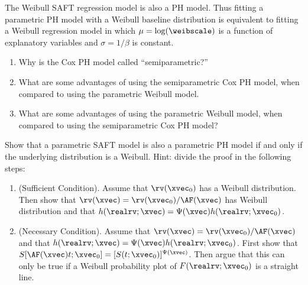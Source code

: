 \begin{exercise}
The Weibull SAFT regression model is also a PH model. Thus fitting a
parametric PH model with a Weibull baseline distribution is equivalent
to fitting a Weibull regression model in which $\mu=\log(\weibscale)$
is a function of explanatory variables and $\sigma=1/\beta$ is
constant.
\begin{enumerate}
\item
Why is the Cox PH model called ``semiparametric?''
\item
What are some advantages of using the semiparametric Cox PH model,
when compared to using the parametric Weibull model.
\item
What are some advantages of using the parametric Weibull model, when
compared to using the semiparametric Cox PH model?  
\end{enumerate}
\end{exercise}

\begin{exercise1}
Show that a parametric SAFT model is also a parametric PH model if and
only if the underlying distribution is a Weibull.
Hint: divide the proof in the following steps:
\begin{enumerate}
\item
(Sufficient Condition). Assume that $\rv(\xvec_{0})$ has a Weibull
distribution. Then show that
$\rv(\xvec)=\rv(\xvec_{0})/\AF(\xvec)$ has
Weibull distribution and that
$h(\realrv; \xvec)=\Psi(\xvec) h(\realrv; \xvec_{0})$.
\item
(Necessary Condition). Assume that
$\rv(\xvec)=\rv(\xvec_{0})/\AF(\xvec)$ and
that
$h(\realrv; \xvec)=\Psi(\xvec) h(\realrv; \xvec_{0})$.
First show that
$S[\AF(\xvec) t;\xvec_{0}] = [S(t;\xvec_{0})]^{\Psi(\xvec)}$. 
Then argue that this can only be true if
a Weibull probability plot of $F(\realrv;\xvec_{0})$
is a straight line.
\end{enumerate}
\end{exercise1}
